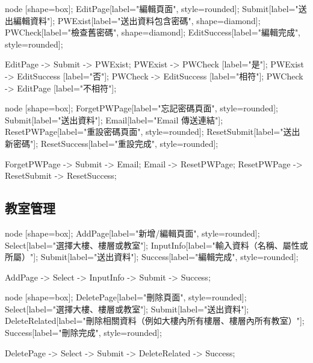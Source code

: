 \documentclass{article}
\begin{document}
\pagebreak

\begin{center}

	 {
		node [shape=box];
		EditPage[label="編輯頁面", style=rounded];
		Submit[label="送出編輯資料"];
		PWExist[label="送出資料包含密碼", shape=diamond];
		PWCheck[label="檢查舊密碼", shape=diamond];
		EditSuccess[label="編輯完成", style=rounded];

		EditPage -> Submit -> PWExist;
		PWExist -> PWCheck [label="是"];
		PWExist -> EditSuccess [label="否"];
		PWCheck -> EditSuccess [label="相符"];
		PWCheck -> EditPage [label="不相符"];
	}
\end{center}

\begin{center}

	 {
		node [shape=box];
		ForgetPWPage[label="忘記密碼頁面", style=rounded];
		Submit[label="送出資料"];
		Email[label="Email 傳送連結"];
		ResetPWPage[label="重設密碼頁面", style=rounded];
		ResetSubmit[label="送出新密碼"];
		ResetSuccess[label="重設完成", style=rounded];

		ForgetPWPage -> Submit -> Email;
		Email -> ResetPWPage;
		ResetPWPage -> ResetSubmit -> ResetSuccess;
	}

\end{center}

\pagebreak

\subsection{教室管理}

\begin{center}

	 {
		node [shape=box];
		AddPage[label="新增/編輯頁面", style=rounded];
		Select[label="選擇大樓、樓層或教室"];
		InputInfo[label="輸入資料（名稱、屬性或所屬）"];
		Submit[label="送出資料"];
		Success[label="編輯完成", style=rounded];

		AddPage -> Select -> InputInfo -> Submit -> Success;
	}
\end{center}

\begin{center}

	 {
		node [shape=box];
		DeletePage[label="刪除頁面", style=rounded];
		Select[label="選擇大樓、樓層或教室"];
		Submit[label="送出資料"];
		DeleteRelated[label="刪除相關資料（例如大樓內所有樓層、樓層內所有教室）"];
		Success[label="刪除完成", style=rounded];

		DeletePage -> Select -> Submit -> DeleteRelated -> Success;
	}
\end{center}
\end{document}
